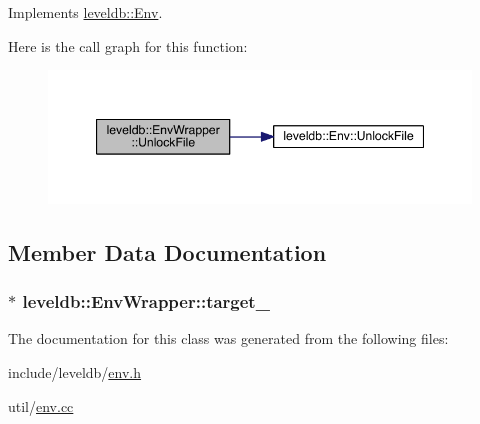 Implements \hyperlink{classleveldb_1_1_env_a194a2ee3c21bc0b204ad0e5bc3b81d4b}{leveldb\+::\+Env}.



Here is the call graph for this function\+:\nopagebreak
\begin{figure}[H]
\begin{center}
\leavevmode
\includegraphics[width=347pt]{classleveldb_1_1_env_wrapper_ab1779dda39167eaa38e660bcc69988c4_cgraph}
\end{center}
\end{figure}




\subsection{Member Data Documentation}
\hypertarget{classleveldb_1_1_env_wrapper_aa5f60f55ace84b8c311ba543025dbcdc}{}
\subsubsection[{target\+\_\+}]{$\ast$ leveldb\+::\+Env\+Wrapper\+::target\+\_\+\hspace{0.3cm}{\ttfamily [private]}}\label{classleveldb_1_1_env_wrapper_aa5f60f55ace84b8c311ba543025dbcdc}


The documentation for this class was generated from the following files\+:\begin{DoxyCompactItemize}
\item 
include/leveldb/\hyperlink{env_8h}{env.\+h}\item 
util/\hyperlink{env_8cc}{env.\+cc}\end{DoxyCompactItemize}
